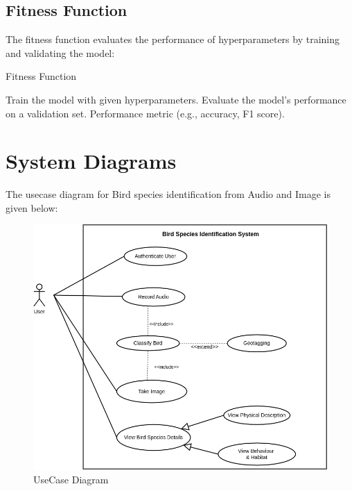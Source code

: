 \subsection{Fitness Function}
The fitness function evaluates the performance of hyperparameters by training and validating the model:

\begin{algorithm}[H]
\caption{Fitness Function}
\begin{algorithmic}[1]
\STATE Train the model with given hyperparameters.
\STATE Evaluate the model's performance on a validation set.
\RETURN Performance metric (e.g., accuracy, F1 score).
\end{algorithmic}
\end{algorithm}



\newpage
\section{System Diagrams}
The usecase diagram for Bird species identification from Audio and Image is given below:
\vspace{1 cm}
\begin{figure}[h!]
    \centering
        \includegraphics[scale=0.5]{images/usecase.png}
        \caption{UseCase Diagram}%
    \end{figure}

